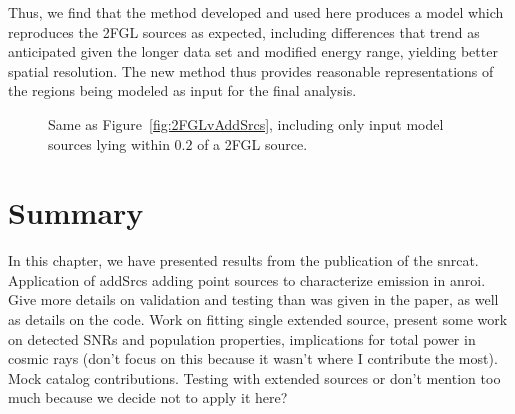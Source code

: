 Thus, we find that the method developed and used here produces a model which reproduces the 2FGL sources as expected, including differences that trend as anticipated given the longer data set and modified energy range, yielding better spatial resolution. The new method thus provides reasonable representations of the regions being modeled as input for the final analysis.



\begin{figure}[h!]%
	\centering
	\caption{Same as Figure~\ref{fig:2FGLvAddSrcs}, including only input model sources lying within $0.2$\degr{} of a 2FGL source.}%
	\label{fig:2FGLvAddSrcsAssoc} 
\end{figure}

\section{Summary}\label{snrcat:summ}
In this chapter, we have presented results from the publication of the \gls{snrcat}. Application of addSrcs adding point sources to characterize emission in an\gls{roi}. Give more details on validation and testing than was given in the paper, as well as details on the code. Work on fitting single extended source, present some work on detected SNRs and population properties, implications for total power in cosmic rays (don't focus on this because it wasn't where I contribute the most). Mock catalog contributions. Testing with extended sources or don't mention too much because we decide not to apply it here?
